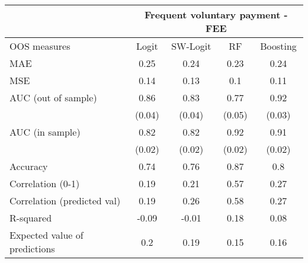 \begin{tabular}{lcccc}
\toprule
      & \multicolumn{4}{c}{Frequent voluntary payment - FEE} \\
\midrule
\midrule
OOS measures & Logit & SW-Logit & RF    & Boosting \\
\midrule
\midrule
MAE   & 0.25  & 0.24  & 0.23  & 0.24 \\
MSE   & 0.14  & 0.13  & 0.1   & 0.11 \\
AUC (out of sample) & 0.86  & 0.83  & 0.77  & 0.92 \\
      & (0.04) & (0.04) & (0.05) & (0.03) \\
AUC (in sample) & 0.82  & 0.82  & 0.92  & 0.91 \\
      & (0.02) & (0.02) & (0.02) & (0.02) \\
Accuracy & 0.74  & 0.76  & 0.87  & 0.8 \\
Correlation (0-1) & 0.19  & 0.21  & 0.57  & 0.27 \\
Correlation (predicted val) & 0.19  & 0.26  & 0.58  & 0.27 \\
R-squared  & -0.09 & -0.01 & 0.18  & 0.08 \\
Expected value of predictions & 0.2   & 0.19  & 0.15  & 0.16 \\
\bottomrule
\bottomrule
\end{tabular}%
